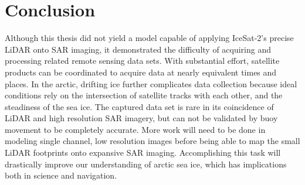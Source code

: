 \chapter{Conclusion}
\label{sec:Conclusion}

Although this thesis did not yield a model capable of applying IceSat-2's precise LiDAR onto SAR imaging, it demonstrated the difficulty of acquiring and processing related remote sensing data sets. With substantial effort, satellite products can be coordinated to acquire data at nearly equivalent times and places. In the arctic, drifting ice further complicates data collection because ideal conditions rely on the intersection of satellite tracks with each other, and the steadiness of the sea ice. The captured data set is rare in its coincidence of LiDAR and high resolution SAR imagery, but can not be validated by buoy movement to be completely accurate. More work will need to be done in modeling single channel, low resolution images before being able to map the small LiDAR footprints onto expansive SAR imaging. Accomplishing this task will drastically improve our understanding of arctic sea ice, which has implications both in science and navigation.